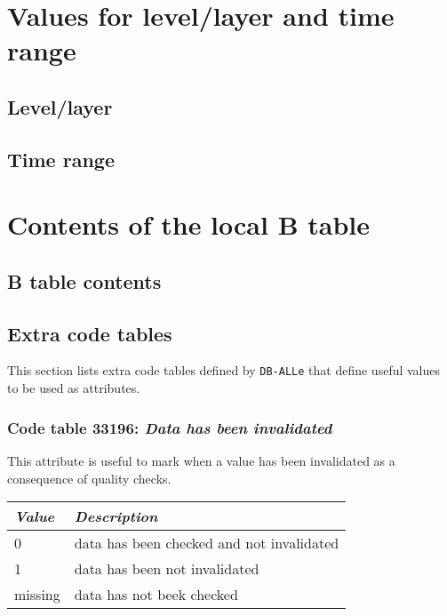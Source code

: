 \documentclass[final,12pt,a4paper,twoside]{book}
\newcommand{\dballe}{{\tt DB-ALLe}}
\begin{document}
\chapter{Values for level/layer and time range}

\section{Level/layer}
\label{levels}



\section{Time range}
\label{tranges}



\chapter{Contents of the local B table}

\section{B table contents}

\label{btable}


\section{Extra code tables}
\label{extract}

This section lists extra code tables defined by \dballe{} that define useful
values to be used as attributes.

\subsection{Code table 33196: \emph{Data has been invalidated}}

This attribute is useful to mark when a value has been invalidated as a
consequence of quality checks.

\begin{tabular}{|l|l|}
\hline
{\em Value} & {\em Description}               \\
\hline
          0 & data has been checked and not invalidated  \\
          1 & data has been not invalidated              \\
    missing & data has not beek checked                  \\
\hline
\end{tabular}
\end{document}
